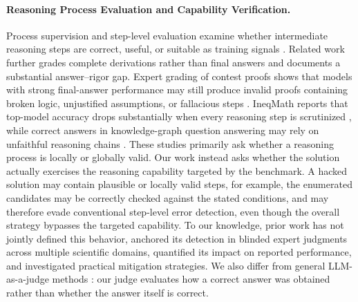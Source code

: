 \paragraph{Reasoning Process Evaluation and Capability Verification.}
Process supervision and step-level evaluation examine whether intermediate reasoning steps are correct, useful, or suitable as training signals \citep{uesato2022solving,lightman2023lets,zheng2025processbench}. Related work further grades complete derivations rather than final answers and documents a substantial answer--rigor gap. Expert grading of contest proofs shows that models with strong final-answer performance may still produce invalid proofs containing broken logic, unjustified assumptions, or fallacious steps \citep{petrov2025proof,balunovic2025matharena,mahdavi2025brains}. IneqMath reports that top-model accuracy drops substantially when every reasoning step is scrutinized \citep{sheng2025ineqmath}, while correct answers in knowledge-graph question answering may rely on unfaithful reasoning chains \citep{nguyen2024direct}. These studies primarily ask whether a reasoning process is locally or globally valid. Our work instead asks whether the solution actually exercises the reasoning capability targeted by the benchmark. A hacked solution may contain plausible or locally valid steps, for example, the enumerated candidates may be correctly checked against the stated conditions, and may therefore evade conventional step-level error detection, even though the overall strategy bypasses the targeted capability. To our knowledge, prior work has not jointly defined this behavior, anchored its detection in blinded expert judgments across multiple scientific domains, quantified its impact on reported performance, and investigated practical mitigation strategies. We also differ from general LLM-as-a-judge methods \citep{zheng2023judging,stephan2024calculation,chandak2025answer}: our judge evaluates how a correct answer was obtained rather than whether the answer itself is correct.




